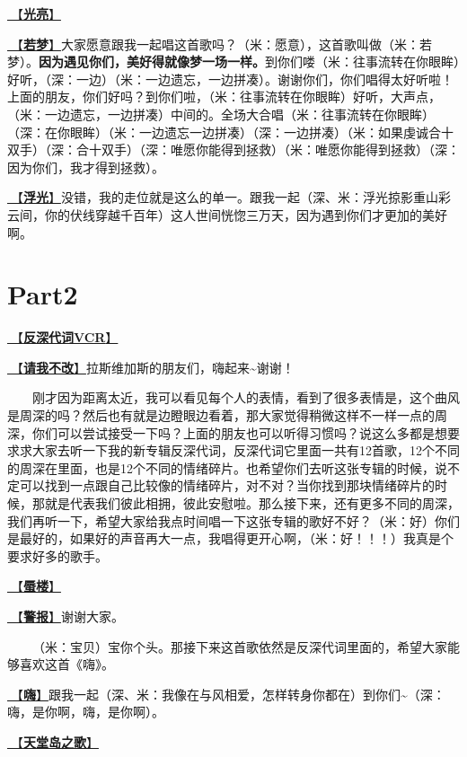 \documentclass[]{ctexbook}
\begin{document}
\hyperref[silver-linings]{🎵【\textbf{光亮}】}

\hyperref[ruomeng]{🎵【\textbf{若梦}】}大家愿意跟我一起唱这首歌吗？（米：愿意），这首歌叫做（米：若梦）。\textbf{因为遇见你们，美好得就像梦一场一样。}到你们喽（米：往事流转在你眼眸）好听，（深：一边）（米：一边遗忘，一边拼凑）。谢谢你们，你们唱得太好听啦！上面的朋友，你们好吗？到你们啦，（米：往事流转在你眼眸）好听，大声点，（米：一边遗忘，一边拼凑）中间的。全场大合唱（米：往事流转在你眼眸）（深：在你眼眸）（米：一边遗忘一边拼凑）（深：一边拼凑）（米：如果虔诚合十双手）（深：合十双手）（深：唯愿你能得到拯救）（米：唯愿你能得到拯救）（深：因为你们，我才得到拯救）。

\hyperref[floating-light]{🎵【\textbf{浮光}】}没错，我的走位就是这么的单一。跟我一起（深、米：浮光掠影重山彩云间，你的伏线穿越千百年）这人世间恍惚三万天，因为遇到你们才更加的美好啊。

\section{Part2}\label{LasVegas-20250301-part2}

\hyperref[senself-vcr]{🎥【\textbf{反深代词VCR}】}

\hyperref[brave-heart]{🎵【\textbf{请我不改}】}拉斯维加斯的朋友们，嗨起来\textasciitilde 谢谢！

  刚才因为距离太近，我可以看见每个人的表情，看到了很多表情是，这个曲风是周深的吗？然后也有就是边瞪眼边看着，那大家觉得稍微这样不一样一点的周深，你们可以尝试接受一下吗？上面的朋友也可以听得习惯吗？说这么多都是想要求求大家去听一下我的新专辑反深代词，反深代词它里面一共有12首歌，12个不同的周深在里面，也是12个不同的情绪碎片。也希望你们去听这张专辑的时候，说不定可以找到一点跟自己比较像的情绪碎片，对不对？当你找到那块情绪碎片的时候，那就是代表我们彼此相拥，彼此安慰啦。那么接下来，还有更多不同的周深，我们再听一下，希望大家给我点时间唱一下这张专辑的歌好不好？（米：好）你们是最好的，如果好的声音再大一点，我唱得更开心啊，（米：好！！！）我真是个要求好多的歌手。

\hyperref[mirage]{🎵【\textbf{蜃楼}】}

\hyperref[the-giver]{🎵【\textbf{警报}】}谢谢大家。

  （米：宝贝）宝你个头。那接下来这首歌依然是反深代词里面的，希望大家能够喜欢这首《嗨》。

\hyperref[say-hi]{🎵【\textbf{嗨}】}跟我一起（深、米：我像在与风相爱，怎样转身你都在）到你们\textasciitilde（深：嗨，是你啊，嗨，是你啊）。

\hyperref[haven-song]{🎵【\textbf{天堂岛之歌}】}
\end{document}
